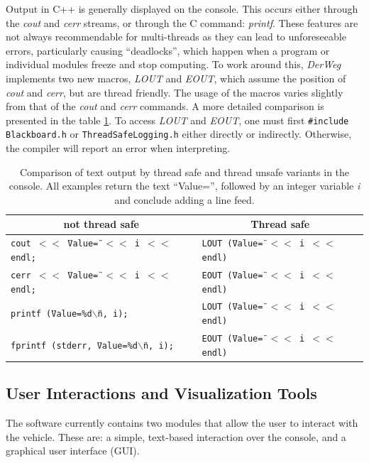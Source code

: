 \documentclass[a4paper, 11pt]{article}
\newcommand{\DerWeg}{\textit{DerWeg }} %
\begin{document}
Output in C++ is generally displayed on the console. This occurs either through the \textit{cout} and \textit{cerr} streams, or through the C command: \textit{printf}. These features are not always recommendable for multi-threads as they can lead to unforeseeable errors, particularly causing “deadlocks”, which happen when a program or individual modules freeze and stop computing. To work around this, \DerWeg implements two new macros, \textit{LOUT} and \textit{EOUT}, which assume the position of \textit{cout} and \textit{cerr}, but are thread friendly. The usage of the macros varies slightly from that of the \textit{cout} and \textit{cerr} commands. A more detailed comparison is presented in the table \ref{tab:thread_safe_logging}. To access \textit{LOUT} and \textit{EOUT}, one must first \texttt{\#include} \texttt{Blackboard.h} or \texttt{ThreadSafeLogging.h} either directly or indirectly. Otherwise, the compiler will report an error when interpreting.

\begin{table}
\centering
\begin{tabular}{|p{}|p{}|}
\hline
\multicolumn{1}{|c|}{not thread safe} & \multicolumn{1}{c|}{Thread safe } \\
\hline
\tt cout $\!<<\!$ \"{}Value=\"{} $\!<<\!$ i $\!<<\!$ endl; &
\tt LOUT (\"{}Value=\"{} $\!<<\!$ i $\!<<\!$ endl) \\
\tt cerr $\!<<\!$ \"{}Value=\"{} $\!<<\!$ i $\!<<\!$ endl; &
\tt EOUT (\"{}Value=\"{} $\!<<\!$ i $\!<<\!$ endl) \\
\tt printf (\"{}Value=\%d$\backslash$n\"{}, i); & 
\tt LOUT (\"{}Value=\"{} $\!<<\!$ i $\!<<\!$ endl) \\
\tt fprintf (stderr, \"{}Value=\%d$\backslash$n\"{}, i); & 
\tt EOUT (\"{}Value=\"{} $\!<<\!$ i $\!<<\!$ endl) \\
\hline
\end{tabular}
\caption{Comparison of text output by thread safe and thread unsafe variants in the console. All examples return the text “Value=”, followed by an integer variable \textit{i} and conclude adding a line feed.}
\label{tab:thread_safe_logging}
\end{table}

\subsection{User Interactions and Visualization Tools}

The software currently contains two modules that allow the user to interact with the vehicle. These are: a simple, text-based interaction over the console, and a graphical user interface (GUI).
\end{document}
